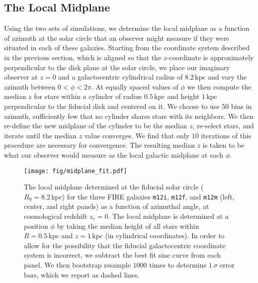 \documentclass[twocolumn]{aastex62}
\newcommand{\kpc}{\text{kpc}}
\newcommand{\mi}{\texttt{m12i}}
\newcommand{\mf}{\texttt{m12f}}
\newcommand{\mm}{\texttt{m12m}}
\newcommand{\z}{z_r}
\begin{document}
\subsection{The Local Midplane} \label{ssec:local_midplane}
Using the two sets of simulations, we determine the local midplane as a
function of azimuth at the solar circle that an observer might measure if they
were situated in each of these galaxies. Starting from the coordinate system
described in the previous section, which is aligned so that the $z$-coordinate
is approximately perpendicular to the disk plane at the solar circle, we place
our imaginary observer at $z=0$ and a galactocentric cylindrical radius of
$8.2\,\kpc$ and vary the azimuth between $0<\phi<2\pi$. At equally spaced
values of $\phi$ we then compute the median $z$ for stars within a cylinder of
radius $0.5\,\kpc$ and height $1\,\kpc$ perpendicular to the fiducial disk and
centered on it. We choose to use 50 bins in azimuth, sufficiently few that no
cylinder shares stars with its neighbors. We then re-define the new midplane
of the cylinder to be the median $z$, re-select stars, and iterate until the
median $z$ value converges. We find that only $10$ iterations of this
procedure are necessary for convergence. The resulting median $z$ is taken to
be what our observer would measure as the local galactic midplane at each
$\phi$.

\begin{figure*}[htb!]
\begin{center}
\texttt{[image: fig/midplane\_fit.pdf]}
\end{center}
\caption{The local midplane determined at the fiducial solar circle
($R_0 = 8.2\,\kpc$) for the three FIRE galaxies \mi{}, \mf{}, and \mm{} (left,
center, and right panels) as a function of azimuthal angle, at cosmological
redshift $\z =0$. The local midplane is determined at a position $\phi$ by
taking the median height of all stars within $R=0.5\,\kpc$ and $z=1\,\kpc$ (in
cylindrical coordinates). In order to allow for the possibility that the
fiducial galactocentric coordinate system is incorrect, we subtract the best
fit sine curve from each panel. We then bootstrap resample $1000$ times to
determine $1\,\sigma $ error bars, which we report as dashed lines.}
\label{fig:midplane}
\end{figure*}
\end{document}
